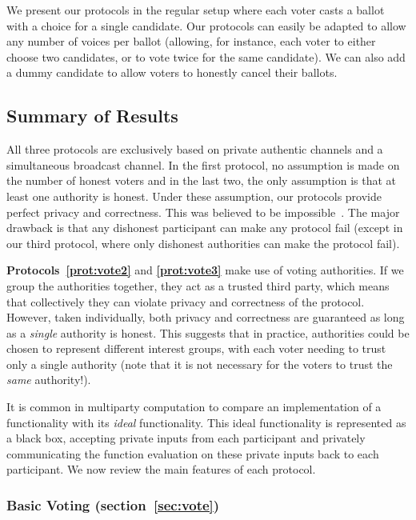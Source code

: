 \documentclass[runningheads]{llncs}
\begin{document}
We present our protocols in the regular setup  where each voter
casts a ballot with a choice for a single candidate. Our protocols
can easily be adapted to allow any number of voices per ballot
(allowing, for instance, each voter to either choose two candidates,
or to vote twice for the same candidate). We can also add a dummy
candidate to allow voters to honestly cancel their ballots.


\subsection{Summary of Results}

All three protocols are exclusively based on private authentic
channels and a simultaneous broadcast channel. In the first
protocol, no assumption is made on the number of honest voters and
in the last two, the only assumption is that at least one authority
is honest. Under these assumption, our protocols provide perfect
privacy and correctness. This was believed to be
impossible~\cite{Jeroen}. The major drawback is that any dishonest
participant can  make any protocol fail (except in our third
protocol, where only dishonest authorities can make the protocol
fail).


\textbf{Protocols~\ref{prot:vote2}} and \textbf{\ref{prot:vote3}}
make use of voting authorities. If we group the authorities
together, they act as a trusted third party, which means that
collectively they can violate privacy and correctness of the
protocol. However, taken individually, both privacy and correctness
are guaranteed as long as a \emph{single} authority is honest. This
suggests that in practice, authorities could be chosen to represent
different interest groups, with each voter needing to trust only a
single authority (note that it is not necessary for the voters to
trust the \emph{same} authority!).

It is common in multiparty computation to compare an implementation
of a functionality with its \emph{ideal} functionality. This ideal
functionality is represented as a black box, accepting private
inputs from each participant and privately communicating the
function evaluation on these private inputs back to each
participant. We now review the main features of each protocol.


\subsubsection{Basic Voting (section~\ref{sec:vote})}
\end{document}

